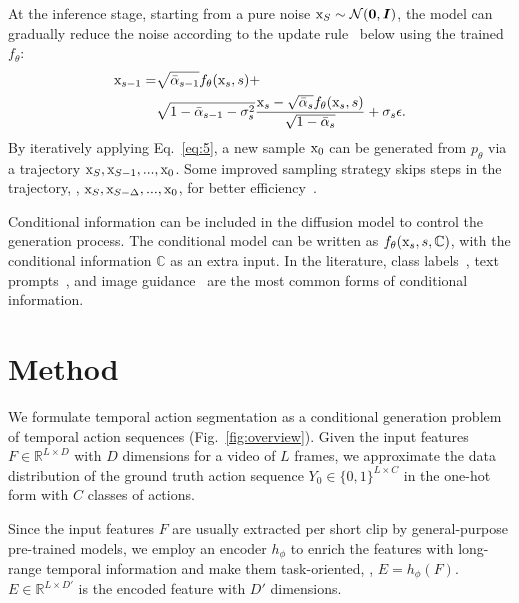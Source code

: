 \documentclass[10pt,twocolumn,letterpaper]{article}
\begin{document}
At the inference stage, starting from a pure noise $\mathrm{x}_{S} \sim \mathcal{N}(\boldsymbol{0}, \boldsymbol{I})$, the model can gradually reduce the noise according to the update rule~\cite{DDIM} below using the trained $f_\theta$:
\begin{equation} \label{eq:5}
\begin{split}
\mathrm{x}_{s-1} = & \sqrt{\bar{\alpha}_{s-1}} f_\theta(\mathrm{x}_{s},s) + \\
& \sqrt{1-\bar{\alpha}_{s-1} - \sigma_s^2} \frac{\mathrm{x}_{s}-\sqrt{\bar{\alpha}_s}f_\theta(\mathrm{x}_{s},s)}{\sqrt{1-\bar{\alpha}_s}} + \sigma_s \epsilon.
\end{split}
\end{equation}
By iteratively applying Eq.~\ref{eq:5}, a new sample $\mathrm{x}_{0}$ can be generated from $p_{\theta}$ via a trajectory $\mathrm{x}_{S}, \mathrm{x}_{S-1}, ..., \mathrm{x}_{0}$. 
Some improved sampling strategy skips steps in the trajectory, \ie, $\mathrm{x}_{S}, \mathrm{x}_{S-\Delta}, ..., \mathrm{x}_{0}$, for better efficiency~\cite{DDIM}.




Conditional information can be included in the diffusion model to control the generation process.
The conditional model can be written as $f_\theta(\mathrm{x}_{s},s,\mathbb{C})$, with the conditional information $\mathbb{C}$ as an extra input. 
In the literature, class labels~\cite{BeatsGAN}, text prompts~\cite{gu2022vector,kim2021diffusionclip}, and image guidance~\cite{preechakul2022diffusion} are the most common forms of conditional information.

\section{Method}

We formulate temporal action segmentation as a conditional generation problem of temporal action sequences (Fig.~\ref{fig:overview}).
Given the input features $F \in \mathbb{R}^{L \times D}$ with $D$ dimensions for a video of $L$ frames, we approximate the data distribution of the ground truth action sequence $Y_0 \in \{0,1\}^{L \times C}$ in the one-hot form with $C$ classes of actions.

Since the input features $F$ are usually extracted per short clip by general-purpose pre-trained models, we employ an encoder $h_\phi$ to enrich the features with long-range temporal information and make them task-oriented, \ie, $E = h_\phi(F)$.
$E \in \mathbb{R}^{L \times D'}$ is the encoded feature with $D'$ dimensions.
\end{document}
